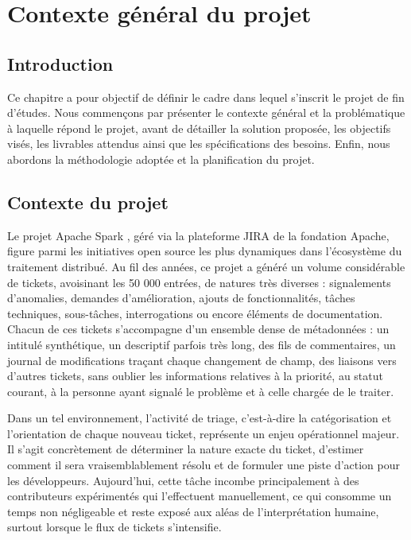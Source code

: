 \chapter{Contexte général du projet}
    
\lfoot{\leftmark}

\section{Introduction}
Ce chapitre a pour objectif de définir le cadre dans lequel s'inscrit le projet de fin d'études. Nous commençons par présenter le contexte général et la problématique à laquelle répond le projet, avant de détailler la solution proposée, les objectifs visés, les livrables attendus ainsi que les spécifications des besoins. Enfin, nous abordons la méthodologie adoptée et la planification du projet.

\section{Contexte du projet}
Le projet Apache Spark \cite{logo:apache_spark}, géré via la plateforme JIRA \cite{logo:jira_apache} de la fondation Apache, figure parmi les initiatives open source les plus dynamiques dans l'écosystème du traitement distribué. Au fil des années, ce projet a généré un volume considérable de tickets, avoisinant les 50 000 entrées, de natures très diverses : signalements d'anomalies, demandes d'amélioration, ajouts de fonctionnalités, tâches techniques, sous-tâches, interrogations ou encore éléments de documentation. Chacun de ces tickets s'accompagne d'un ensemble dense de métadonnées : un intitulé synthétique, un descriptif parfois très long, des fils de commentaires, un journal de modifications traçant chaque changement de champ, des liaisons vers d'autres tickets, sans oublier les informations relatives à la priorité, au statut courant, à la personne ayant signalé le problème et à celle chargée de le traiter.

Dans un tel environnement, l'activité de triage, c'est-à-dire la catégorisation et l'orientation de chaque nouveau ticket, représente un enjeu opérationnel majeur. Il s'agit concrètement de déterminer la nature exacte du ticket, d'estimer comment il sera vraisemblablement résolu et de formuler une piste d'action pour les développeurs. Aujourd'hui, cette tâche incombe principalement à des contributeurs expérimentés qui l'effectuent manuellement, ce qui consomme un temps non négligeable et reste exposé aux aléas de l'interprétation humaine, surtout lorsque le flux de tickets s'intensifie.

